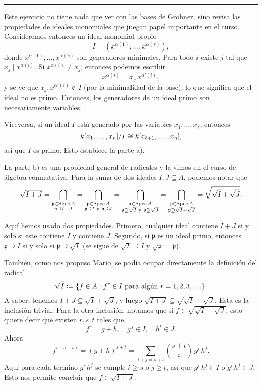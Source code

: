 \documentclass{article}
\theoremstyle{definition}
\begin{document}
\ifdefined\solutions
\hrule
\vspace{1em}

Este ejercicio no tiene nada que ver con las bases de Gröbner, sino revisa las
propiedades de ideales monomiales que juegan papel importante en el
curso. Consideremos entonces un ideal monomial propio
$$I = (x^{\alpha (1)}, \ldots, x^{\alpha (s)}),$$
donde $x^{\alpha (1)}, \ldots, x^{\alpha (s)}$ son generadores minimales. Para
todo $i$ existe $j$ tal que $x_j \mid x^{\alpha (i)}$.
Si $x^{\alpha (i)} \ne x_j$, entonces podemos escribir
$$x^{\alpha (i)} = x_j\,x^{\alpha' (i)},$$
y se ve que $x_j, x^{\alpha' (i)} \notin I$ (por la minimalidad de la base),
lo que significa que el ideal no es primo. Entonces, los generadores de un ideal
primo son necesariamente variables.

Viceversa, si un ideal $I$ está generado por las variables $x_1,\ldots,x_\ell$,
entonces
$$k [x_1,\ldots,x_n]/I \cong k [x_{\ell+1},\ldots,x_n],$$
así que $I$ es primo. Esto establece la parte a).

\vspace{1em}

La parte b) es una propiedad general de radicales y la vimos en el curso de
álgebra conmutativa. Para la suma de dos ideales $I,J\subseteq A$, podemos notar
que
\[ \sqrt{I + J} =
   \bigcap_{\substack{\mathfrak{p} \in \operatorname{Spec} A \\ \mathfrak{p} \supseteq I + J}} =
   \bigcap_{\substack{\mathfrak{p} \in \operatorname{Spec} A \\ \mathfrak{p} \supseteq I \text{ y } \mathfrak{p} \supseteq J}} =
   \bigcap_{\substack{\mathfrak{p} \in \operatorname{Spec} A \\ \mathfrak{p} \supseteq \sqrt{I} \text{ y } \mathfrak{p} \supseteq \sqrt{J}}} =
   \bigcap_{\substack{\mathfrak{p} \in \operatorname{Spec} A \\ \mathfrak{p} \supseteq \sqrt{I} + \sqrt{J}}} =
   \sqrt{\sqrt{I} + \sqrt{J}}. \]
 
Aquí hemos usado dos propiedades. Primero, cualquier ideal contiene $I + J$ si y
solo si este contiene $I$ y contiene $J$. Segundo, si $\mathfrak{p}$ es un ideal
primo, entonces $\mathfrak{p} \supseteq I$ si y solo si
$\mathfrak{p} \supseteq \sqrt{I}$ (se sigue de $\sqrt{I} \supseteq I$ y
$\sqrt{\mathfrak{p}} = \mathfrak{p}$).

También, como nos propuso Mario, se podía ocupar directamente la definición del
radical
$$\sqrt{I} \mathrel{\mathop:}= \{ f \in A \mid f^r \in I\text{ para algún }r = 1,2,3,\ldots \}.$$
A saber, tenemos $I + J \subseteq \sqrt{I} + \sqrt{J}$, y luego
$\sqrt{I + J} \subseteq \sqrt{\sqrt{I} + \sqrt{J}}$. Esta es la inclusión
trivial. Para la otra inclusión, notamos que si
$f \in \sqrt{\sqrt{I} + \sqrt{J}}$, esto quiere decir que existen $r,s,t$ tales
que
$$f^r = g + h, \quad g^s \in I, \quad h^t \in J.$$
Ahora
$$f^{r\,(s+t)} = (g+h)^{s+t} = \sum_{i + j = s+t} {s+t \choose i} \, g^i\,h^j.$$
Aquí para cada término $g^i\,h^j$ se cumple $i \ge s$ o $j \ge t$, así que
$g^i\,h^j \in I$ o $g^i\,h^j \in J$. Esto nos permite concluir que
$f \in \sqrt{I + J}$.
\end{document}
